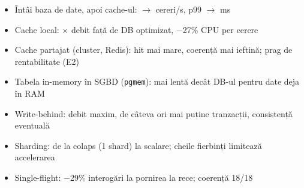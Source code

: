 \small
\begin{itemize}
  \item \alert{Întâi baza de date, apoi cache-ul}:  $\rightarrow$  cereri/s, p99  $\rightarrow$  ms
  \item Cache local: × debit față de DB optimizat, $-$27\% CPU per cerere
  \item Cache partajat (cluster, Redis): hit mai mare, coerență mai ieftină; prag de rentabilitate (E2)
  \item Tabela in-memory în SGBD (\texttt{pgmem}): \alert{mai lentă decât DB-ul} pentru date deja în RAM
  \item Write-behind: debit maxim, de câteva ori mai puține tranzacții, consistență eventuală
  \item Sharding: de la colaps (1 shard) la scalare; cheile fierbinți limitează accelerarea
  \item Single-flight: $-$29\% interogări la pornirea la rece; coerență 18/18
\end{itemize}
